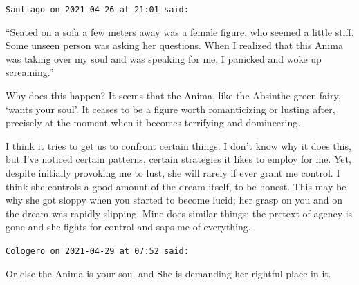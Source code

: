 \begin{footnotesize}
\begin{sffamily}
\texttt{Santiago on 2021-04-26 at 21:01 said:}

``Seated on a sofa a few meters away was a female figure, who seemed a little stiff. Some unseen person was asking her questions. When I realized that this Anima was taking over my soul and was speaking for me, I panicked and woke up screaming.''

Why does this happen? It seems that the Anima, like the Absinthe green fairy, `wants your soul'. It ceases to be a figure worth romanticizing or lusting after, precisely at the moment when it becomes terrifying and domineering.

I think it tries to get us to confront certain things. I don't know why it does this, but I've noticed certain patterns, certain strategies it likes to employ for me. Yet, despite initially provoking me to lust, she will rarely if ever grant me control. I think she controls a good amount of the dream itself, to be honest. This may be why she got sloppy when you started to become lucid; her grasp on you and on the dream was rapidly slipping. Mine does similar things; the pretext of agency is gone and she fights for control and saps me of everything.

\hfill

\texttt{Cologero on 2021-04-29 at 07:52 said:}

Or else the Anima is your soul and She is demanding her rightful place in it.

\end{sffamily}
\end{footnotesize}

